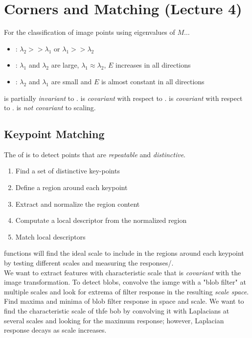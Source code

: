 \documentclass{article}
\begin{document}
\section{Corners and Matching (Lecture 4)}

For the classification of image points using eigenvalues of $M\dots$ 
\begin{itemize}
  \item {}: $\lambda_2 >> \lambda_1$ or $\lambda_1 >> \lambda_2$
  \item {}: $\lambda_1$ and $\lambda_2$ are large, $\lambda_1 \approx \lambda_2$, $E$ increases in all directions 
  \item {}: $\lambda_2$ and $\lambda_1$ are small and $E$ is almost constant in all directions 
\end{itemize}

 is partially \emph{invariant} to .  is \emph{covariant} with respect to .  is \emph{covariant} with respect to .  is \emph{not covariant} to scaling. 

\subsection{Keypoint Matching}

The  of  is to detect points that are \emph{repeatable} and \emph{distinctive}. 

\begin{enumerate}
  \item Find a set of distinctive key-points 
  \item Define a region around each keypoint 
  \item Extract and normalize the region content 
  \item Computate a local descriptor from the normalized region 
  \item Match local descriptors 
\end{enumerate}

 functions will find the ideal scale to include in the regions around each keypoint by testing different scales and measuring the responses/. \\ 

We want to extract features with characteristic scale that is \emph{covariant} with the image transformation. To detect blobs, convolve the iamge with a "blob filter" at multiple scales and look for extrema of filter response in the resulting \emph{scale space}. Find maxima and minima of blob filter response in space and scale. We want to find the characteristic scale of thfe bob by convolving it with Laplacians at several scales and looking for the maximum response; however, Laplacian response decays as scale increases. \\ 
\end{document}
